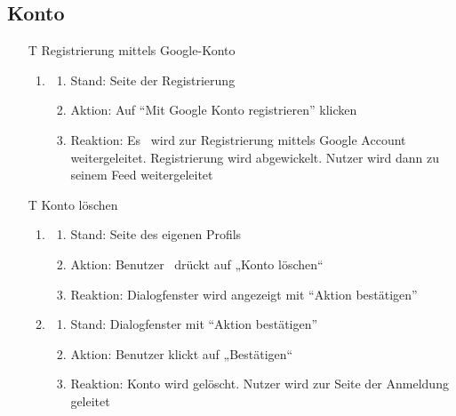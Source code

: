 \documentclass[parskip=full]{scrartcl}
\begin{document}
	\subsection{Konto}
		
		\begin{itemize}
			\item[T] Registrierung mittels Google-Konto
\begin{enumerate}
	\item
	\begin{enumerate}[nosep]	
	\item Stand: Seite der Registrierung
	\item Aktion:  Auf “Mit Google Konto registrieren” klicken
	\item Reaktion: Es  wird zur Registrierung mittels Google Account weitergeleitet. Registrierung wird abgewickelt. Nutzer wird dann zu seinem Feed weitergeleitet
\end{enumerate} 
\end{enumerate}



\item[T] Konto löschen
\begin{enumerate}
	\item
	\begin{enumerate}[nosep]	
	\item Stand: Seite des eigenen Profils
	\item Aktion: Benutzer  drückt auf „Konto löschen“
	\item Reaktion: Dialogfenster wird angezeigt mit “Aktion bestätigen”
\end{enumerate} 
\item
	\begin{enumerate}[nosep]	
	\item Stand: Dialogfenster mit “Aktion bestätigen”
	\item Aktion: Benutzer klickt auf „Bestätigen“
	\item Reaktion: Konto wird gelöscht. Nutzer wird zur Seite der Anmeldung geleitet
\end{enumerate}
\end{enumerate}




\end{itemize}
\end{document}
